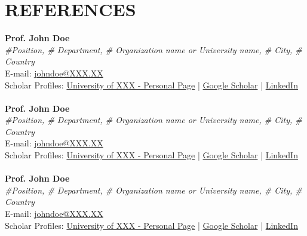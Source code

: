 \section*{REFERENCES}
\textbf{Prof. John Doe}\\
\textit{\#Position, \# Department, \# Organization name or University name, \# City, \# Country}\\
E-mail: \href{mailto:johndoe@XXX.XX}{johndoe@XXX.XX}\\
Scholar Profiles: \href{related link}{University of XXX - Personal Page} | \href{related link}{Google Scholar} | \href{https://www.linkedin.com/in/xxxxxxxx}{LinkedIn}\\ \\
\textbf{Prof. John Doe}\\
\textit{\#Position, \# Department, \# Organization name or University name, \# City, \# Country}\\
E-mail: \href{mailto:johndoe@XXX.XX}{johndoe@XXX.XX}\\
Scholar Profiles: \href{related link}{University of XXX - Personal Page} | \href{related link}{Google Scholar} | \href{https://www.linkedin.com/in/xxxxxxxx}{LinkedIn}\\ \\
\textbf{Prof. John Doe}\\
\textit{\#Position, \# Department, \# Organization name or University name, \# City, \# Country}\\
E-mail: \href{mailto:johndoe@XXX.XX}{johndoe@XXX.XX}\\
Scholar Profiles: \href{related link}{University of XXX - Personal Page} | \href{related link}{Google Scholar} | \href{https://www.linkedin.com/in/xxxxxxxx}{LinkedIn}\\ \\

